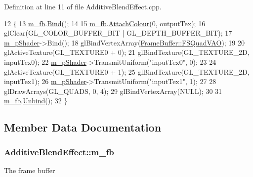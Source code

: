 Definition at line 11 of file Additive\+Blend\+Effect.\+cpp.


\begin{DoxyCode}
12 \{
13   \hyperlink{class_additive_blend_effect_aa047c3ebbd318f3faee9dc17b63680e7}{m\_fb}.\hyperlink{class_frame_buffer_ae7e61568475fba3b15e446c9061833ea}{Bind}();
14 
15   \hyperlink{class_additive_blend_effect_aa047c3ebbd318f3faee9dc17b63680e7}{m\_fb}.\hyperlink{class_frame_buffer_a1556417c0dec00d1d24bdf0e84bc4c4d}{AttachColour}(0, outputTex);
16   glClear(GL\_COLOR\_BUFFER\_BIT | GL\_DEPTH\_BUFFER\_BIT);
17   \hyperlink{class_additive_blend_effect_a5f25db987222e0f6cefb14116da373e9}{m\_pShader}->Bind();
18   glBindVertexArray(\hyperlink{class_frame_buffer_a22b0c9de2bef06e0de865684556a6677}{FrameBuffer::FSQuadVAO});
19 
20   glActiveTexture(GL\_TEXTURE0 + 0);
21   glBindTexture(GL\_TEXTURE\_2D, inputTex0);
22   \hyperlink{class_additive_blend_effect_a5f25db987222e0f6cefb14116da373e9}{m\_pShader}->TransmitUniform(\textcolor{stringliteral}{"inputTex0"}, 0);
23 
24   glActiveTexture(GL\_TEXTURE0 + 1);
25   glBindTexture(GL\_TEXTURE\_2D, inputTex1);
26   \hyperlink{class_additive_blend_effect_a5f25db987222e0f6cefb14116da373e9}{m\_pShader}->TransmitUniform(\textcolor{stringliteral}{"inputTex1"}, 1);
27 
28   glDrawArrays(GL\_QUADS, 0, 4);
29   glBindVertexArray(NULL);
30 
31   \hyperlink{class_additive_blend_effect_aa047c3ebbd318f3faee9dc17b63680e7}{m\_fb}.\hyperlink{class_frame_buffer_a1e114b325998ec4e4b9a9ea090d64ae8}{Unbind}();
32 \}
\end{DoxyCode}


\subsection{Member Data Documentation}
\subsubsection[{\texorpdfstring{m\+\_\+fb}{m_fb}}]{ Additive\+Blend\+Effect\+::m\+\_\+fb\hspace{0.3cm}{\ttfamily [private]}}\hypertarget{class_additive_blend_effect_aa047c3ebbd318f3faee9dc17b63680e7}{}\label{class_additive_blend_effect_aa047c3ebbd318f3faee9dc17b63680e7}


The frame buffer 




